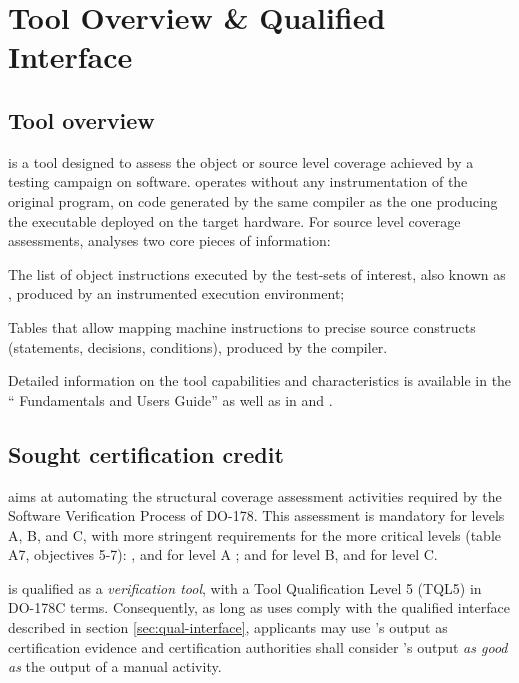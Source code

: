 \documentclass {report}
\begin{document}
\chapter{Tool Overview \& Qualified Interface}


\section{Tool overview}

\xcov{} is a tool designed to assess the object or source level coverage
achieved by a testing campaign on software.
%
\xcov{} operates without any instrumentation of the original program, on
code generated by the same compiler as the one producing the executable
deployed on the target hardware.
%
For source level coverage assessments, \xcov{} analyses two core pieces of
information:

\begin{Itemize}
%
\item The list of object instructions executed by the test-sets of interest,
  also known as , produced by an instrumented execution
  environment;
%
\item Tables that allow mapping machine instructions to precise source
  constructs (statements, decisions, conditions), produced by the compiler.
\end{Itemize}

Detailed information on the tool capabilities and characteristics is available
in the ``\xcov{} Fundamentals and Users Guide'' as well as in \adaeurope and
\erts.

\section {Sought certification credit}

\xcov{} aims at automating the structural coverage assessment activities
required by the Software Verification Process of DO-178.
%
This assessment is mandatory for levels A, B, and C, with more stringent
requirements for the more critical levels (table A7, objectives 5-7): \mcdc{},
\dc{} and \stc{} for level A ; \dc{} and \stc{} for level B, and \stc{} for
 level C.

\xcov{} is qualified as a \emph{verification tool}, with a Tool Qualification
Level 5 (TQL5) in DO-178C terms.
%
Consequently, as long as uses comply with the qualified interface described in
section \ref{sec:qual-interface}, applicants may use \xcov{}'s output as
certification evidence and certification authorities shall consider \xcov{}'s
output \emph{as good as} the output of a manual activity.
\end{document}
